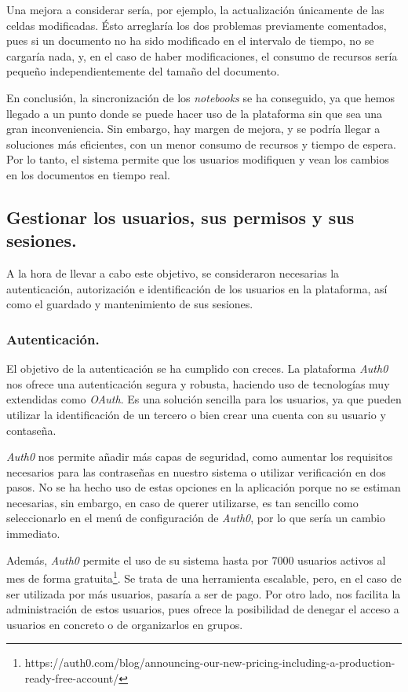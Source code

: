 \documentclass[11pt,spanish,listoffigures]{tfgetsinf}
\begin{document}
Una mejora a considerar sería, por ejemplo, la actualización únicamente de las celdas modificadas. Ésto arreglaría los dos problemas previamente comentados, pues si un documento no ha sido modificado en el intervalo de tiempo, no se cargaría nada, y, en el caso de haber modificaciones, el consumo de recursos sería pequeño independientemente del tamaño del documento. 

En conclusión, la sincronización de los \textit{notebooks} se ha conseguido, ya que hemos llegado a un punto donde se puede hacer uso de la plataforma sin que sea una gran inconveniencia. Sin embargo, hay margen de mejora, y se podría llegar a soluciones más eficientes, con un menor consumo de recursos y tiempo de espera. Por lo tanto, el sistema permite que los usuarios modifiquen y vean los cambios en los documentos en tiempo real.

\subsection{Gestionar los usuarios, sus permisos y sus sesiones.}
\label{subsec:objetivos-conc-roles}

A la hora de llevar a cabo este objetivo, se consideraron necesarias la autenticación, autorización e identificación de los usuarios en la plataforma, así como el guardado y mantenimiento de sus sesiones.

\subsubsection{Autenticación.}
\label{subsec:objetivos-conc-auth}

El objetivo de la autenticación se ha cumplido con creces. La plataforma \textit{Auth0} nos ofrece una autenticación segura y robusta, haciendo uso de tecnologías muy extendidas como \textit{OAuth}. Es una solución sencilla para los usuarios, ya que pueden utilizar la identificación de un tercero o bien crear una cuenta con su usuario y contaseña. 

\textit{Auth0} nos permite añadir más capas de seguridad, como aumentar los requisitos necesarios para las contraseñas en nuestro sistema o utilizar verificación en dos pasos. No se ha hecho uso de estas opciones en la aplicación porque no se estiman necesarias, sin embargo, en caso de querer utilizarse, es tan sencillo como seleccionarlo en el menú de configuración de \textit{Auth0}, por lo que sería un cambio immediato.

Además, \textit{Auth0} permite el uso de su sistema hasta por 7000 usuarios activos al mes de forma gratuita\footnote{https://auth0.com/blog/announcing-our-new-pricing-including-a-production-ready-free-account/}. Se trata de una herramienta escalable, pero, en el caso de ser utilizada por más usuarios, pasaría a ser de pago. Por otro lado, nos facilita la administración de estos usuarios, pues ofrece la posibilidad de denegar el acceso a usuarios en concreto o de organizarlos en grupos.
\end{document}
